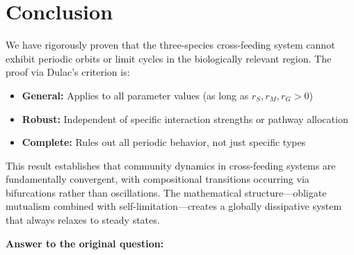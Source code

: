 \documentclass[11pt]{article}
\begin{document}
\section{Conclusion}

We have rigorously proven that the three-species cross-feeding system cannot exhibit periodic orbits or limit cycles in the biologically relevant region. The proof via Dulac's criterion is:

\begin{itemize}
    \item \textbf{General:} Applies to all parameter values (as long as $r_S, r_M, r_G > 0$)
    \item \textbf{Robust:} Independent of specific interaction strengths or pathway allocation
    \item \textbf{Complete:} Rules out all periodic behavior, not just specific types
\end{itemize}

This result establishes that community dynamics in cross-feeding systems are fundamentally convergent, with compositional transitions occurring via bifurcations rather than oscillations. The mathematical structure—obligate mutualism combined with self-limitation—creates a globally dissipative system that always relaxes to steady states.

\vspace{1em}

\noindent\textbf{Answer to the original question:}

\begin{center}
\end{center}
\end{document}
